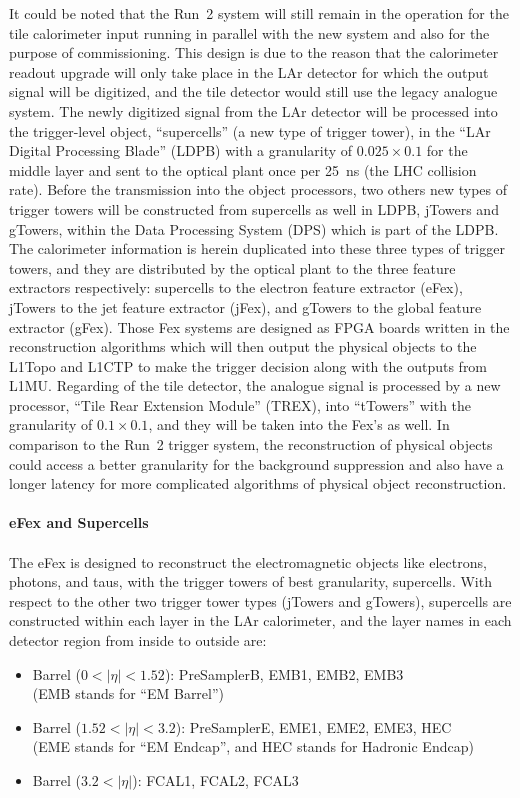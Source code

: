 It could be noted that the Run~2 system will still remain in the operation for the tile calorimeter input running in parallel with the new system and also for the purpose of commissioning. This design is due to the reason that the calorimeter readout upgrade will only take place in the LAr detector for which the output signal will be digitized, and the tile detector would still use the legacy analogue system. The newly digitized signal from the LAr detector will be processed into the trigger-level object, ``supercells'' (a new type of trigger tower), in the ``LAr Digital Processing Blade'' (LDPB) with a granularity of $0.025\times0.1$ for the middle layer and sent to the optical plant once per 25~ns (the LHC collision rate). Before the transmission into the object processors, two others new types of trigger towers will be constructed from supercells as well in LDPB, jTowers and gTowers, within the Data Processing System (DPS) which is part of the LDPB. The calorimeter information is herein duplicated into these three types of trigger towers, and they are distributed by the optical plant to the three feature extractors respectively: supercells to the electron feature extractor (eFex), jTowers to the jet feature extractor (jFex), and gTowers to the global feature extractor (gFex). Those Fex systems are designed as FPGA boards written in the reconstruction algorithms which will then output the physical objects to the L1Topo and L1CTP to make the trigger decision along with the outputs from L1MU. Regarding of the tile detector, the analogue signal is processed by a new processor, ``Tile Rear Extension Module'' (TREX), into ``tTowers'' with the granularity of $0.1\times0.1$, and they will be taken into the Fex's as well. In comparison to the Run~2 trigger system, the reconstruction of physical objects could access a better granularity for the background suppression and also have a longer latency for more complicated algorithms of physical object reconstruction.   
\\
\\{\bf eFex and Supercells}
\\
\\The eFex is designed to reconstruct the electromagnetic objects like electrons, photons, and taus, with the trigger towers of best granularity, supercells. With respect to the other two trigger tower types (jTowers and gTowers), supercells are constructed within each layer in the LAr calorimeter, and the layer names in each detector region from inside to outside are:
\begin{itemize}
	\item Barrel ($0<|\eta|<1.52$): PreSamplerB, EMB1, EMB2, EMB3 \\ (EMB stands for ``EM Barrel'')
	\item Barrel ($1.52<|\eta|<3.2$): PreSamplerE, EME1, EME2, EME3, HEC \\ (EME stands for ``EM Endcap'', and HEC stands for Hadronic Endcap)
	\item Barrel ($3.2<|\eta|$): FCAL1, FCAL2, FCAL3
\end{itemize}
